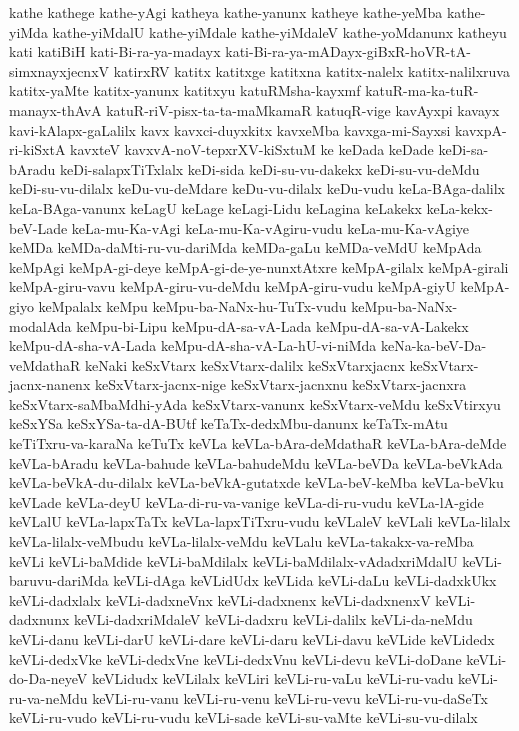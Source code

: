 {kathe
kathege
kathe-yAgi
katheya
kathe-yanunx
katheye
kathe-yeMba
kathe-yiMda
kathe-yiMdalU
kathe-yiMdale
kathe-yiMdaleV
kathe-yoMdanunx
katheyu
kati
katiBiH
kati-Bi-ra-ya-madayx
kati-Bi-ra-ya-mADayx-giBxR-hoVR-tA-simxnayxjecnxV
katirxRV
katitx
katitxge
katitxna
katitx-nalelx
katitx-nalilxruva
katitx-yaMte
katitx-yanunx
katitxyu
katuRMsha-kayxmf
katuR-ma-ka-tuR-manayx-thAvA
katuR-riV-pisx-ta-ta-maMkamaR
katuqR-vige
kavAyxpi
kavayx
kavi-kAlapx-gaLalilx
kavx
kavxci-duyxkitx
kavxeMba
kavxga-mi-Sayxsi
kavxpA-ri-kiSxtA
kavxteV
kavxvA-noV-tepxrXV-kiSxtuM
ke
keDada
keDade
keDi-sa-bAradu
keDi-salapxTiTxlalx
keDi-sida
keDi-su-vu-dakekx
keDi-su-vu-deMdu
keDi-su-vu-dilalx
keDu-vu-deMdare
keDu-vu-dilalx
keDu-vudu
keLa-BAga-dalilx
keLa-BAga-vanunx
keLagU
keLage
keLagi-Lidu
keLagina
keLakekx
keLa-kekx-beV-Lade
keLa-mu-Ka-vAgi
keLa-mu-Ka-vAgiru-vudu
keLa-mu-Ka-vAgiye
keMDa
keMDa-daMti-ru-vu-dariMda
keMDa-gaLu
keMDa-veMdU
keMpAda
keMpAgi
keMpA-gi-deye
keMpA-gi-de-ye-nunxtAtxre
keMpA-gilalx
keMpA-girali
keMpA-giru-vavu
keMpA-giru-vu-deMdu
keMpA-giru-vudu
keMpA-giyU
keMpA-giyo
keMpalalx
keMpu
keMpu-ba-NaNx-hu-TuTx-vudu
keMpu-ba-NaNx-modalAda
keMpu-bi-Lipu
keMpu-dA-sa-vA-Lada
keMpu-dA-sa-vA-Lakekx
keMpu-dA-sha-vA-Lada
keMpu-dA-sha-vA-La-hU-vi-niMda
keNa-ka-beV-Da-veMdathaR
keNaki
keSxVtarx
keSxVtarx-dalilx
keSxVtarxjacnx
keSxVtarx-jacnx-nanenx
keSxVtarx-jacnx-nige
keSxVtarx-jacnxnu
keSxVtarx-jacnxra
keSxVtarx-saMbaMdhi-yAda
keSxVtarx-vanunx
keSxVtarx-veMdu
keSxVtirxyu
keSxYSa
keSxYSa-ta-dA-BUtf
keTaTx-dedxMbu-danunx
keTaTx-mAtu
keTiTxru-va-karaNa
keTuTx
keVLa
keVLa-bAra-deMdathaR
keVLa-bAra-deMde
keVLa-bAradu
keVLa-bahude
keVLa-bahudeMdu
keVLa-beVDa
keVLa-beVkAda
keVLa-beVkA-du-dilalx
keVLa-beVkA-gutatxde
keVLa-beV-keMba
keVLa-beVku
keVLade
keVLa-deyU
keVLa-di-ru-va-vanige
keVLa-di-ru-vudu
keVLa-lA-gide
keVLalU
keVLa-lapxTaTx
keVLa-lapxTiTxru-vudu
keVLaleV
keVLali
keVLa-lilalx
keVLa-lilalx-veMbudu
keVLa-lilalx-veMdu
keVLalu
keVLa-takakx-va-reMba
keVLi
keVLi-baMdide
keVLi-baMdilalx
keVLi-baMdilalx-vAdadxriMdalU
keVLi-baruvu-dariMda
keVLi-dAga
keVLidUdx
keVLida
keVLi-daLu
keVLi-dadxkUkx
keVLi-dadxlalx
keVLi-dadxneVnx
keVLi-dadxnenx
keVLi-dadxnenxV
keVLi-dadxnunx
keVLi-dadxriMdaleV
keVLi-dadxru
keVLi-dalilx
keVLi-da-neMdu
keVLi-danu
keVLi-darU
keVLi-dare
keVLi-daru
keVLi-davu
keVLide
keVLidedx
keVLi-dedxVke
keVLi-dedxVne
keVLi-dedxVnu
keVLi-devu
keVLi-doDane
keVLi-do-Da-neyeV
keVLidudx
keVLilalx
keVLiri
keVLi-ru-vaLu
keVLi-ru-vadu
keVLi-ru-va-neMdu
keVLi-ru-vanu
keVLi-ru-venu
keVLi-ru-vevu
keVLi-ru-vu-daSeTx
keVLi-ru-vudo
keVLi-ru-vudu
keVLi-sade
keVLi-su-vaMte
keVLi-su-vu-dilalx
}
